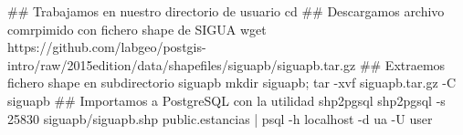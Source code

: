 \lstset{caption=Importación de estancias,label=bash:importarEstancias}
\begin{bash}
## Trabajamos en nuestro directorio de usuario
cd
## Descargamos archivo comrpimido con fichero shape de SIGUA
wget https://github.com/labgeo/postgis-intro/raw/2015edition/data/shapefiles/siguapb/siguapb.tar.gz
## Extraemos fichero shape en subdirectorio siguapb
mkdir siguapb; tar -xvf siguapb.tar.gz -C siguapb
## Importamos a PostgreSQL con la utilidad shp2pgsql
shp2pgsql -s 25830 siguapb/siguapb.shp public.estancias  | psql -h localhost -d ua -U user
\end{bash}
